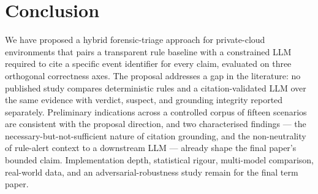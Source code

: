 \documentclass[conference]{IEEEtran}
\begin{document}
\section{Conclusion}
\label{sec:conclusion}

We have proposed a hybrid forensic-triage approach for private-cloud environments that pairs a transparent rule baseline with a constrained LLM required to cite a specific event identifier for every claim, evaluated on three orthogonal correctness axes. The proposal addresses a gap in the literature: no published study compares deterministic rules and a citation-validated LLM over the same evidence with verdict, suspect, and grounding integrity reported separately. Preliminary indications across a controlled corpus of fifteen scenarios are consistent with the proposal direction, and two characterised findings --- the necessary-but-not-sufficient nature of citation grounding, and the non-neutrality of rule-alert context to a downstream LLM --- already shape the final paper's bounded claim. Implementation depth, statistical rigour, multi-model comparison, real-world data, and an adversarial-robustness study remain for the final term paper.
\end{document}
